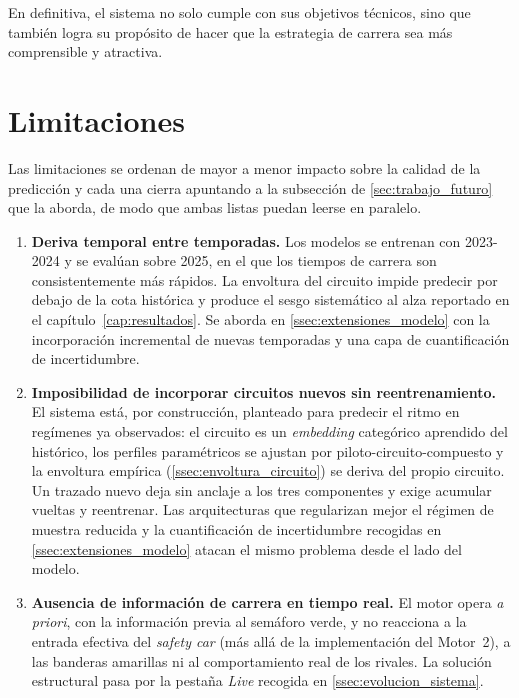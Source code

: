 En definitiva, el sistema no solo cumple con sus objetivos técnicos, sino que también logra su propósito de hacer que la estrategia de carrera sea más comprensible y atractiva.

\section{Limitaciones}
\label{sec:limitaciones}

Las limitaciones se ordenan de mayor a menor impacto sobre la calidad de la predicción y cada una cierra apuntando a la subsección de \ref{sec:trabajo_futuro} que la aborda, de modo que ambas listas puedan leerse en paralelo.

\begin{enumerate}
    \item \textbf{Deriva temporal entre temporadas.} Los modelos se entrenan con 2023-2024 y se evalúan sobre 2025, en el que los tiempos de carrera son consistentemente más rápidos. La envoltura del circuito impide predecir por debajo de la cota histórica y produce el sesgo sistemático al alza reportado en el capítulo~\ref{cap:resultados}. Se aborda en \ref{ssec:extensiones_modelo} con la incorporación incremental de nuevas temporadas y una capa de cuantificación de incertidumbre.

    \item \textbf{Imposibilidad de incorporar circuitos nuevos sin reentrenamiento.} El sistema está, por construcción, planteado para predecir el ritmo en regímenes ya observados: el circuito es un \textit{embedding} categórico aprendido del histórico, los perfiles paramétricos se ajustan por piloto-circuito-compuesto y la envoltura empírica (\ref{ssec:envoltura_circuito}) se deriva del propio circuito. Un trazado nuevo deja sin anclaje a los tres componentes y exige acumular vueltas y reentrenar. Las arquitecturas que regularizan mejor el régimen de muestra reducida y la cuantificación de incertidumbre recogidas en \ref{ssec:extensiones_modelo} atacan el mismo problema desde el lado del modelo.

    \item \textbf{Ausencia de información de carrera en tiempo real.} El motor opera \textit{a priori}, con la información previa al semáforo verde, y no reacciona a la entrada efectiva del \textit{safety car} (más allá de la implementación del Motor~2), a las banderas amarillas ni al comportamiento real de los rivales. La solución estructural pasa por la pestaña \textit{Live} recogida en \ref{ssec:evolucion_sistema}.


\end{enumerate}
